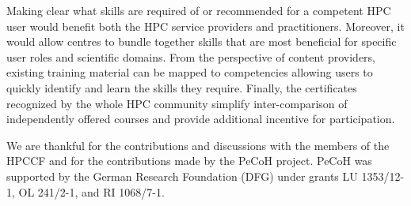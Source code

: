 \documentclass[jocse]{jocseart}
\newcommand{\jk}[1]{\todo[inline]{TODO: #1}}
\begin{document}
Making clear what skills are required of or recommended for a competent HPC user would benefit both the HPC service providers and practitioners.
Moreover, it would allow centres to bundle together skills that are most beneficial for specific user roles and scientific domains.
From the perspective of content providers, existing training material can be mapped to competencies allowing users to quickly identify and learn the skills they require.
Finally, the certificates recognized by the whole HPC community simplify inter-comparison of independently offered courses and provide additional incentive for participation.





\appendix

\begin{acks}
\small
We are thankful for the contributions and discussions with the members of the HPCCF and for the contributions made by the PeCoH project.
\jk{TODO}
PeCoH was supported by the German Research Foundation (DFG) under grants LU 1353/12-1, OL 241/2-1, and RI 1068/7-1.
\end{acks}



\end{document}
